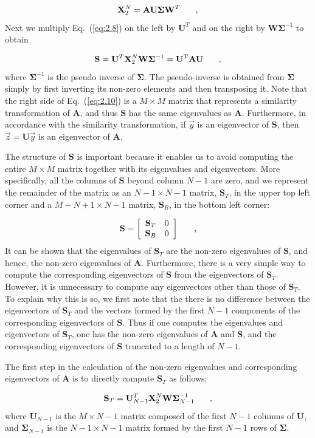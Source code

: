 \documentclass[12pt]{article}
\newcommand{\bracket}[1]{\left[ #1 \right]}
\renewcommand{\vec}[1]{\overrightarrow{#1}}
\newcommand{\be}{\begin{equation}}
\newcommand{\ee}{\end{equation}}
\newcommand{\pec}{\hspace{0.25in},}
\newcommand{\LEQ}[1]{\label{eq:#1}}
\newcommand{\EQ}[1]{Eq.~(\ref{eq:#1})}
\newcommand{\mA}{\mathbf{A}}
\newcommand{\mX}{\mathbf{X}}
\newcommand{\mU}{\mathbf{U}}
\newcommand{\mW}{\mathbf{W}}
\newcommand{\mSigma}{\mathbf{\Sigma}}
\newcommand{\mS}{\mathbf{S}}
\begin{document}
\be
	\mX_2^{N} = \mA \mU \mSigma \mW^T \pec
	\LEQ{2.8}
\ee
Next we multiply \EQ{2.8} on the left by $\mU^{T}$ and on the right by
 $\mW\mSigma^{-1}$ to obtain 

\be
	\mS = \mU^{T}\mX_2^{N}\mW\mSigma^{-1} = \mU^{T}\mA\mU \pec
	\LEQ{2.10}
\ee
where $\mSigma^{-1}$ is the pseudo inverse of $\mSigma$.  
The pseudo-inverse is obtained from $\mSigma$ simply by first inverting its 
 non-zero elements and then transposing it. 
Note that the right side of \EQ{2.10} is a $M \times M$ matrix that represents 
a similarity transformation of $\mA$, and thus $\mS$ has the same eigenvalues as $\mA$.  
Furthermore, in accordance with the similarity transformation, 
 if $\vec{y}$ is an eigenvector of $\mS$, then $\vec{z} = \mU \vec{y}$ is an eigenvector of $\mA$.  

The structure of $\mS$ is important because it enables us to avoid computing
 the entire $M \times M$ matrix together with its eigenvalues and eigenvectors.
More specifically, all the columns of $\mS$ beyond column $N-1$ are zero, and 
 we represent the remainder of the matrix as an $N-1 \times N-1$ matrix, 
 $\mS_{T}$, in the upper top left corner and a $M-N+1 \times N-1$ matrix, 
 $\mS_B$, in the bottom left corner:
 
\be
	\mS = \bracket{
	\begin{array}{cc}
		\mS_T  & 0 \\
		\mS_B & 0  
	\end{array}
	} \pec
	\LEQ{2.11}
\ee
It can be shown that the eigenvalues of $\mS_T$ are the non-zero eigenvalues of
 $\mS$, and hence, the non-zero eigenvalues of $\mA$.  
Furthermore, there is a very simple way to compute the corresponding 
 eigenvectors of $\mS$ from the eigenvectors of $\mS_T$. 
However, it is unnecessary to compute any eigenvectors other than those of $\mS_T$.  
To explain why this is so, we first note that the there is no difference 
 between the eigenvectors of $\mS_T$ and the vectors formed by the first $N-1$ 
 components of the corresponding eigenvectors of $\mS$.  
Thus if one computes the eigenvalues and eigenvectors of $\mS_T$, one has the 
 non-zero eigenvalues of $\mA$ and $\mS$, and the corresponding eigenvectors of 
 $\mS$ truncated to a length of $N-1$.

The first step in the calculation of the non-zero eigenvalues and corresponding 
 eigenvectors of $\mA$ is to directly compute $\mS_T$ as follows:

\be
	\mS_T = \mU_{N-1}^{T} \mX_{2}^{N}\mW\mSigma^{-1}_{N-1} \pec
	\LEQ{2.12}
\ee
where $\mU_{N-1}$ is the $M \times N-1$ matrix composed of the first $N-1$ 
 columns of $\mU$, and $\mSigma_{N-1}$ is the $N-1 \times N-1$ matrix formed by 
 the first $N-1$ rows of $\mSigma$.  
\end{document}
